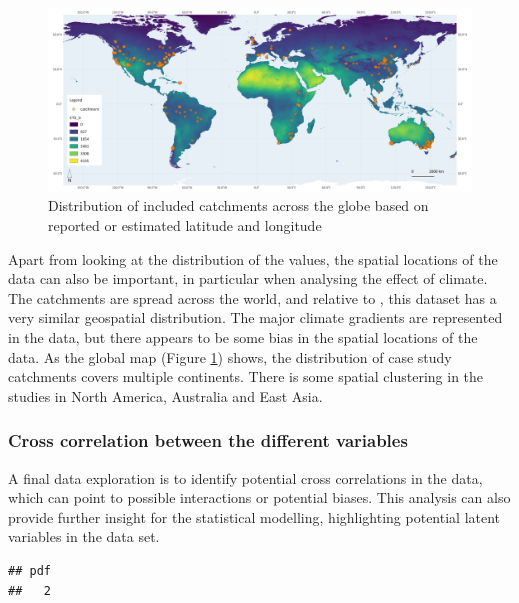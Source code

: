 \documentclass[]{elsarticle} %
\begin{document}
\begin{figure}
\includegraphics[width=0.9\linewidth]{FAOET0data_final_2022} \caption{Distribution of included catchments across the globe based on reported or estimated latitude and longitude}\label{fig:globalmap}
\end{figure}

Apart from looking at the distribution of the values, the spatial locations of the data can also be important, in particular when analysing the effect of climate. The catchments are spread across the world, and relative to \citet{zhang2017}, this dataset has a very similar geospatial distribution. The major climate gradients are represented in the data, but there appears to be some bias in the spatial locations of the data. As the global map (Figure \ref{fig:globalmap}) shows, the distribution of case study catchments covers multiple continents. There is some spatial clustering in the studies in North America, Australia and East Asia.

\hypertarget{cross-correlation-between-the-different-variables}{%
\subsubsection{Cross correlation between the different variables}\label{cross-correlation-between-the-different-variables}}

A final data exploration is to identify potential cross correlations in the data, which can point to possible interactions or potential biases. This analysis can also provide further insight for the statistical modelling, highlighting potential latent variables in the data set.

\begin{verbatim}
## pdf 
##   2
\end{verbatim}
\end{document}
